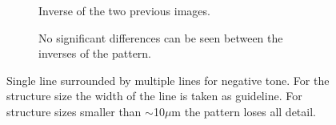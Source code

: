 \begin{figure}[htb]
\begin{subfigure}[t]{0.24\linewidth}
  	\centering
  	\caption{Inverse of the two previous images.}
  	\label{fig:b2d31_q32}
  \end{subfigure}
\hfill
     \begin{subfigure}[t]{0.24\linewidth}
  	\centering
  	\caption{No significant differences can be seen between the inverses of the pattern.}
  	\label{fig:b2d33_q34}
 \end{subfigure}
\caption{Single line surrounded by multiple lines for negative tone. For the structure size the width of the line is taken as guideline. For structure sizes smaller than $\sim$10$\mu$m the pattern loses all detail.}
 \end{figure}



